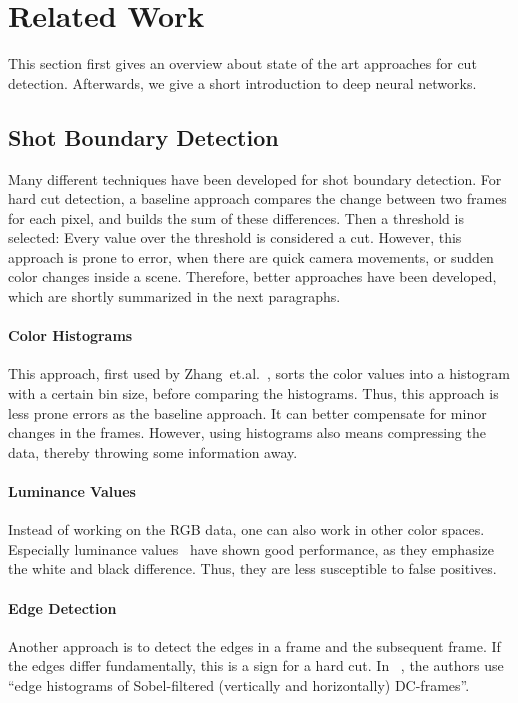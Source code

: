 \section{Related Work}
\label{sec:related_work}

This section first gives an overview about state of the art approaches for cut detection.
Afterwards, we give a short introduction to deep neural networks.

\subsection{Shot Boundary Detection}

Many different techniques have been developed for shot boundary detection.
For hard cut detection, a baseline approach compares the change between two frames for each pixel, and builds the sum of these differences.
Then a threshold is selected: Every value over the threshold is considered a cut.
However, this approach is prone to error, when there are quick camera movements, or sudden color changes inside a scene.
Therefore, better approaches have been developed, which are shortly summarized in the next paragraphs.

\paragraph{Color Histograms}
This approach, first used by Zhang~et.al.~\cite{zhang1993automatic}, sorts the color values into a histogram with a certain bin size, before comparing the histograms.
Thus, this approach is less prone errors as the baseline approach.
It can better compensate for minor changes in the frames.
However, using histograms also means compressing the data, thereby throwing some information away.

\paragraph{Luminance Values}
Instead of working on the RGB data, one can also work in other color spaces.
Especially luminance values~\cite{petersohn2004fraunhofer} have shown good performance, as they emphasize the white and black difference.
Thus, they are less susceptible to false positives.

\paragraph{Edge Detection}
Another approach is to detect the edges in a frame and the subsequent frame.
If the edges differ fundamentally, this is a sign for a hard cut.
In ~\cite{ewerth2005university}, the authors use ``edge histograms of Sobel-filtered (vertically and horizontally) DC-frames''.

